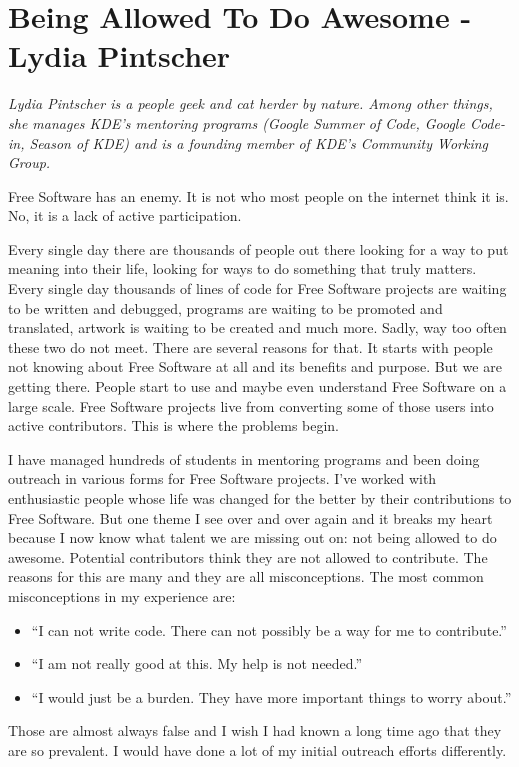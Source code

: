 \chapter{Being Allowed To Do Awesome - Lydia Pintscher}

\textit{Lydia Pintscher is a people geek and cat herder by nature. Among other things, she manages KDE's mentoring programs (Google Summer of Code, Google Code-in, Season of KDE) and is a founding member of KDE's Community Working Group.}

Free Software has an enemy. It is not who most people on the internet think it is. No, it is a lack of active participation.

Every single day there are thousands of people out there looking for a way to put meaning into their life, looking for ways to do something that truly matters. Every single day thousands of lines of code for Free Software projects are waiting to be written and debugged, programs are waiting to be promoted and translated, artwork is waiting to be created and much more. Sadly, way too often these two do not meet. There are several reasons for that. It starts with people not knowing about Free Software at all and its benefits and purpose. But we are getting there. People start to use and maybe even understand Free Software on a large scale. Free Software projects live from converting some of those users into active contributors. This is where the problems begin.

I have managed hundreds of students in mentoring programs and been doing outreach in various forms for Free Software projects. I've worked with enthusiastic people whose life was changed for the better by their contributions to Free Software. But one theme I see over and over again and it breaks my heart because I now know what talent we are missing out on: not being allowed to do awesome. Potential contributors think they are not allowed to contribute. The reasons for this are many and they are all misconceptions. The most common misconceptions in my experience are:
\begin{itemize}
 \item ``I can not write code. There can not possibly be a way for me to contribute.''
 \item ``I am not really good at this. My help is not needed.''
 \item ``I would just be a burden. They have more important things to worry about.''
\end{itemize}
Those are almost always false and I wish I had known a long time ago that they are so prevalent. I would have done a lot of my initial outreach efforts differently.
